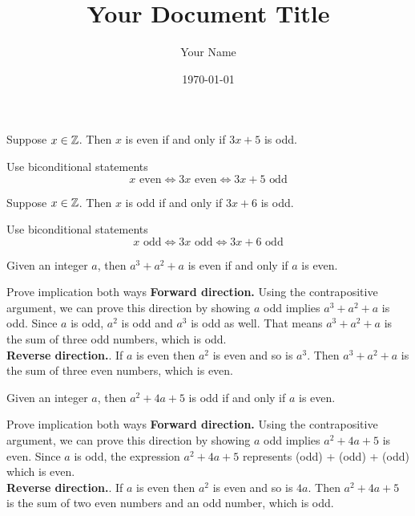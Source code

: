 \documentclass{article}
\title{Your Document Title}
\author{Your Name}
\date{\today} %
\begin{document}
\maketitle

\begin{problem}
Suppose $x \in \mathbb{Z}$. Then $x$ is even if and only if $3x + 5$ is odd.
\end{problem}

\begin{solution}{Use biconditional statements}
    $$x \text{ even} \iff 3x \text{ even} \iff 3x + 5 \text{ odd}$$
\end{solution}

\begin{problem}
Suppose $x \in \mathbb{Z}$. Then $x$ is odd if and only if $3x + 6$ is odd.
\end{problem}
\begin{solution}{Use biconditional statements}
    $$x \text{ odd} \iff 3x \text{ odd} \iff 3x + 6 \text{ odd}$$
\end{solution}

\begin{problem}
Given an integer $a$, then $a^3 + a^2 + a$ is even if and only if $a$ is even.
\end{problem}
\begin{solution}{Prove implication both ways}
    \textbf{Forward direction.} Using the contrapositive argument, we can prove this direction by showing $a$ odd implies $a^3 + a^2 + a$ is odd. Since $a$ is odd, $a^2$ is odd and $a^3$ is odd as well. That means $a^3 + a^2 + a$ is the sum of three odd numbers, which is odd.
    \\
    \textbf{Reverse direction.}. If $a$ is even then $a^2$ is even and so is $a^3$. Then $a^3 + a^2 + a$ is the sum of three even numbers, which is even.
\end{solution}

\begin{problem}
Given an integer $a$, then $a^2 + 4a + 5$ is odd if and only if $a$ is even.
\end{problem}
\begin{solution}{Prove implication both ways}
    \textbf{Forward direction.} Using the contrapositive argument, we can prove this direction by showing $a$ odd implies $a^2 + 4a + 5$ is even. Since $a$ is odd, the expression $a^2 + 4a + 5$ represents (odd) + (odd) + (odd) which is even.
    \\
    \textbf{Reverse direction.}. If $a$ is even then $a^2$ is even and so is $4a$. Then $a^2 + 4a + 5$ is the sum of two even numbers and an odd number, which is odd.
\end{solution}
\end{document}
